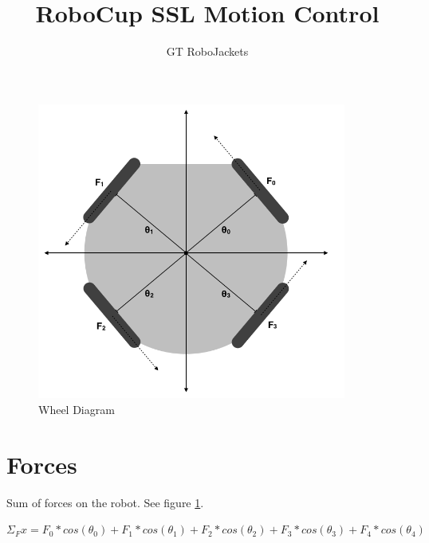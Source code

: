 \documentclass{article}
\author{GT RoboJackets}
\title{RoboCup SSL Motion Control}
\begin{document}
\maketitle



\begin{figure}[p]
	\centering
	\includegraphics[width=4in]{WheelDiagram.png}
	\caption{Wheel Diagram}
	\label{fig:wheel_diagram}
\end{figure}

\section*{Forces}

Sum of forces on the robot. See figure \ref{fig:wheel_diagram}.

$\Sigma_Fx = F_0*cos(\theta_0) + F_1*cos(\theta_1) + F_2*cos(\theta_2) + F_3*cos(\theta_3) + F_4*cos(\theta_4)$
\end{document}
